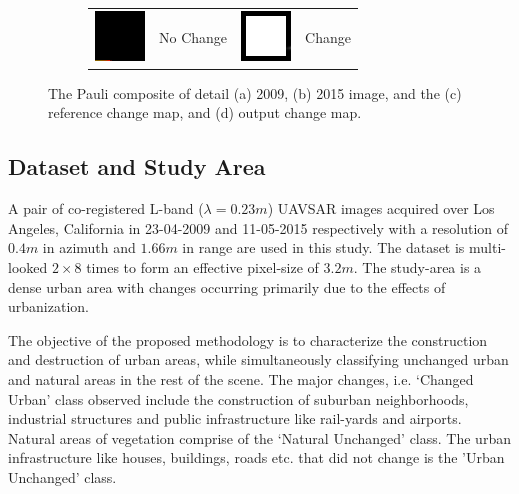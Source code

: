 \begin{figure}[t]
\begin{subfigure}[b]{\columnwidth}
\centering
		\vspace{0.2em}
		\begin{tabular}{c l  c l  }
		 \includegraphics[width=0.02\columnwidth]{Figures/CD/BLK} & No Change   &
		 \includegraphics[width=0.02\columnwidth]{Figures/CD/WHT} & Change
		\end{tabular}
\end{subfigure}
\caption{The Pauli composite of detail (a) 2009, (b) 2015 image, and the (c) reference change map, and (d) output change map.}
\label{fig:3}
\end{figure}

\subsection{Dataset and Study Area}
\label{sec:exp}
A pair of co-registered L-band ($\lambda = 0.23m$) UAVSAR images acquired over Los Angeles, California in 23-04-2009 and 11-05-2015 respectively  with a resolution of $0.4m$ in azimuth and $1.66m$ in range are used in this study. The dataset is multi-looked $2\times8$ times to form an effective pixel-size of $3.2m$.  The study-area is a dense urban area with changes occurring primarily due to the effects of urbanization. 

The objective of the proposed methodology is to  characterize the construction and destruction of urban areas, while simultaneously classifying unchanged urban and natural areas in the rest of the scene.
The major changes, i.e. `Changed Urban' class observed include the construction of suburban neighborhoods, industrial structures and public infrastructure like rail-yards and airports.  Natural areas of vegetation  comprise of the `Natural Unchanged' class. The urban infrastructure like houses, buildings, roads etc. that did not change is the 'Urban Unchanged' class.

